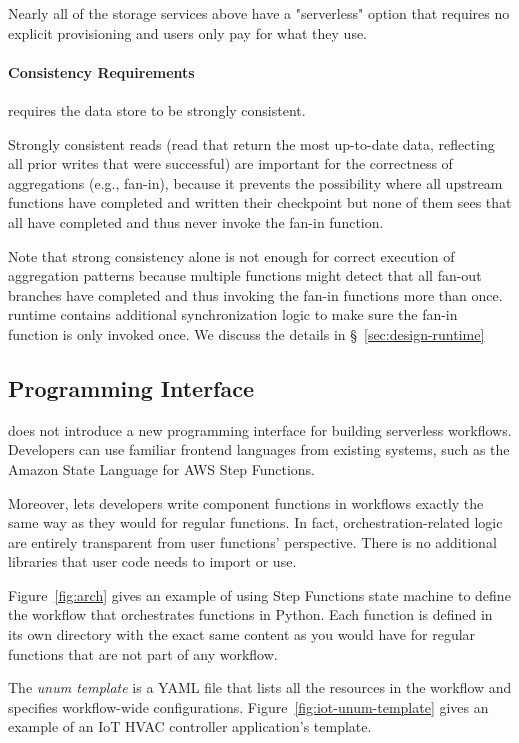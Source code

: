 Nearly all of the storage services above have a "serverless" option that
requires no explicit provisioning and users only pay for what they use.

\paragraph{Consistency Requirements}

\name{} requires the data store to be strongly consistent.

Strongly consistent reads (read that return the most up-to-date data,
reflecting all prior writes that were successful) are important for the
correctness of aggregations (e.g., fan-in), because it prevents the
possibility where all upstream functions have completed and written their
checkpoint but none of them sees that all have completed and thus never invoke
the fan-in function.

Note that strong consistency alone is not enough for correct execution of
aggregation patterns because multiple functions might detect that all fan-out
branches have completed and thus invoking the fan-in functions more than once.
\name{} runtime contains additional synchronization logic to make sure the fan-in
function is only invoked once. We discuss the details in
\S~\ref{sec:design-runtime}


\subsection{Programming Interface}\label{sec:design-interface}

\name{} does not introduce a new programming interface for building serverless
workflows. Developers can use familiar frontend languages from existing
systems, such as the Amazon State Language for AWS Step Functions.

Moreover, \name{} lets developers write component functions in
workflows exactly the same way as they would for regular functions. In fact,
orchestration-related logic are entirely transparent from user functions'
perspective. There is no additional libraries that user code needs to import
or use.

Figure~\ref{fig:arch} gives an example of using Step Functions state machine
to define the workflow that orchestrates functions in Python. Each
function is defined in its own directory with the exact same content as you
would have for regular functions that are not part of any workflow.

The \emph{unum template} is a YAML file that lists all the resources in the
workflow and specifies workflow-wide configurations.
Figure~\ref{fig:iot-unum-template} gives an example of an IoT HVAC controller
application's template.

